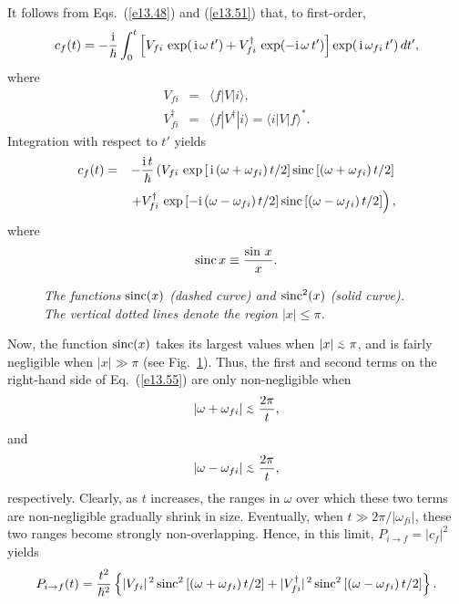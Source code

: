 It follows from Eqs.~(\ref{e13.48}) and (\ref{e13.51}) that, to first-order,
\begin{equation}
c_f(t) = - \frac{\rm i}{\hbar}\int_0^t\left[V_{fi}\,\exp(\,{\rm i}\,\omega\,t') + 
V_{fi}^\dag\,\exp(-{\rm i}\,\omega\,t')\right]
\exp(\,{\rm i}\,\omega_{fi}\,t')\,dt',
\end{equation}
where
\begin{eqnarray}\label{e13.53}
V_{fi}&=&  \langle f|V|i\rangle,\\[0.5ex]
V_{fi}^\dag &=&\langle f|V^\dag|i\rangle = \langle i|V|f\rangle^\ast.
\end{eqnarray}
Integration with respect to $t'$ yields
\begin{eqnarray}
c_f(t)&=& - \frac{{\rm i}\,t}{\hbar}\left(V_{fi}\,\exp\left[\,{\rm i}\,(\omega+\omega_{fi})\,t/2\right]{\rm sinc}\left[(\omega+\omega_{fi})\,t/2\right]\right.\nonumber\\[0.5ex]&&
\left.+V_{fi}^\dag\,\exp\left[-{\rm i}\,(\omega-\omega_{fi})\,t/2\right]{\rm sinc}\left[(\omega-\omega_{fi})\,t/2\right]\right),\label{e13.55}
\end{eqnarray}
where
\begin{equation}
{\rm sinc}\, x\equiv \frac{\sin\,x}{x}.
\end{equation}

\begin{figure}
\epsfysize=3in
\centerline{}
\caption{\em The functions ${\rm sinc}(x)$ (dashed curve) and
${\rm sinc}^2(x)$ (solid curve). The vertical dotted lines denote
the region $|x|\leq \pi$.}\label{fsinc}   
\end{figure}

Now, the function ${\rm sinc}(x)$ takes its  largest values when $|x|\stackrel {_{\normalsize<}}{_{\normalsize \sim}} \pi$, and is  fairly negligible when $|x|\gg \pi$ (see Fig.~\ref{fsinc}). Thus, the first and second terms
on the right-hand side of Eq.~(\ref{e13.55}) are only
non-negligible when
\begin{equation}
|\omega+\omega_{fi}|\stackrel {_{\normalsize<}}{_{\normalsize \sim}} \frac{2\pi}{t},
\end{equation}
and
\begin{equation}
|\omega-\omega_{fi}|\stackrel {_{\normalsize<}}{_{\normalsize \sim}} \frac{2\pi}{t},
\end{equation}
respectively.
Clearly, as $t$ increases, the ranges in $\omega$ over which these two
terms are non-negligible gradually shrink in size.
Eventually, when $t\gg 2\pi/|\omega_{fi}|$, these two ranges become strongly non-overlapping. 
Hence, in this limit, $P_{i\rightarrow f}=|c_f|^2$ yields
\begin{equation}\label{e13.49}
P_{i\rightarrow f}(t) = \frac{t^2}{\hbar^2}\left\{
|V_{fi}|^{\,2}\,{\rm sinc}^2\left[(\omega+\omega_{fi})\,t/2\right]
+ |V_{fi}^\dag|^{\,2}\,{\rm sinc}^2\left[(\omega-\omega_{fi})\,t/2\right]\right\}.\label{e13.59}
\end{equation}

